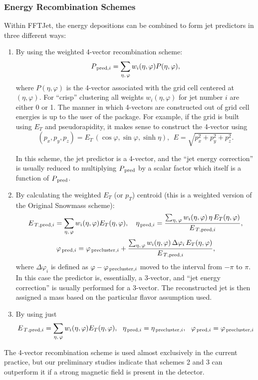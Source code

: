 \documentclass[epsf,12pt,titlepage]{article}
\newcommand{\sub}[1]{\ensuremath{_{\mbox{\scriptsize \,#1}}}}
\begin{document}
\subsubsection{Energy Recombination Schemes}

Within FFTJet, the energy depositions can be combined to form jet predictors
in three different ways:
\begin{enumerate}
\item By using the weighted 4-vector recombination scheme:
$$
P\sub{pred,$i$} = \sum_{\eta, \, \varphi} w_i(\eta, \varphi) P(\eta, \varphi),
$$
where $P(\eta, \varphi)$ is the 4-vector associated with the 
grid cell centered at $(\eta, \varphi)$.
For ``crisp'' clustering all weights $w_i(\eta, \varphi)$ for
jet number $i$ are
either 0 or 1.
The manner in which 4-vectors are constructed out of grid cell
energies is up to the user of the package. For example, if the
grid is built using $E_T$ and pseudorapidity, it makes sense to construct
the 4-vector using
$$
(p_x, p_y, p_z) = E_T \,(\cos \varphi, \sin \varphi, \sinh \eta),
\ \ E = \sqrt{p_x^2 + p_y^2 + p_z^2}.
$$

In this scheme, the jet predictor is
a 4-vector, and the ``jet energy correction'' is usually reduced to
multiplying $P\sub{pred}$ by a scalar factor which itself is a function
of $P\sub{pred}$.

\item By calculating the weighted $E_T$ (or $p_T$) centroid (this is a weighted version of the Original Snowmass scheme):
$$
E\sub{$T$,pred,$i$} = \sum_{\eta, \, \varphi} w_i(\eta, \varphi) E_{T}(\eta, \varphi),\ \ \ \eta\sub{pred,$i$} = \frac{\sum_{\eta, \, \varphi} w_i(\eta, \varphi) \,\eta \,E_{T}(\eta, \varphi)}{E\sub{$T$,pred,$i$}},
$$
$$
\varphi\sub{pred,$i$} = \varphi\sub{precluster,$i$} + \frac{\sum_{\eta, \, \varphi} w_i(\eta, \varphi) \,\Delta \varphi_i \,E_{T}(\eta, \varphi)}{E\sub{$T$,pred,$i$}},
$$
where $\Delta \varphi_i$ is defined as $\varphi - \varphi\sub{precluster,$i$}$
moved to the interval from $-\pi$ to $\pi$. In this case the predictor is,
essentially, a 3-vector, and ``jet energy correction''
is usually performed for a 3-vector. The reconstructed jet is then
assigned a mass based on the particular flavor assumption used.

\item By using just
$$
E\sub{$T$,pred,$i$} = \sum_{\eta, \, \varphi} w_i(\eta, \varphi) E_{T}(\eta, \varphi),\ \ \eta\sub{pred,$i$} = \eta\sub{precluster,$i$},\ \ \varphi\sub{pred,$i$} = \varphi\sub{precluster,$i$}
$$
\end{enumerate}
The 4-vector recombination scheme is used almost exclusively in the
current practice, but our preliminary studies indicate that schemes 2 and 3
can outperform it if a strong magnetic field is present in the detector.
\end{document}
